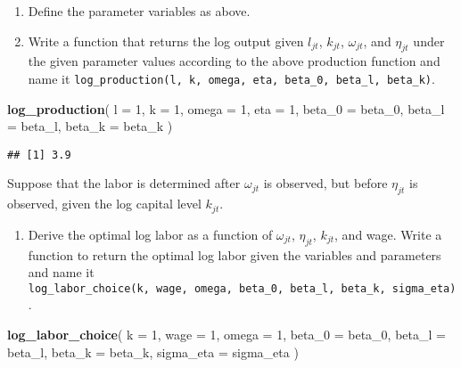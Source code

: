 \documentclass[
]{book}
\newenvironment{Shaded}{\begin{snugshade}}{\end{snugshade}}
\newcommand{\AttributeTok}[1]{\textcolor[rgb]{0.13,0.29,0.53}{#1}}
\newcommand{\DecValTok}[1]{\textcolor[rgb]{0.00,0.00,0.81}{#1}}
\newcommand{\FunctionTok}[1]{\textcolor[rgb]{0.13,0.29,0.53}{\textbf{#1}}}
\newcommand{\NormalTok}[1]{#1}
\providecommand{\tightlist}{%
  \setlength{\itemsep}{0pt}\setlength{\parskip}{0pt}}
\begin{document}
\begin{enumerate}
\def\labelenumi{\arabic{enumi}.}
\item
  Define the parameter variables as above.
\item
  Write a function that returns the log output given \(l_{jt}\), \(k_{jt}\), \(\omega_{jt}\), and \(\eta_{jt}\) under the given parameter values according to the above production function and name it \texttt{log\_production(l,\ k,\ omega,\ eta,\ beta\_0,\ beta\_l,\ beta\_k)}.
\end{enumerate}

\begin{Shaded}
\begin{Highlighting}[]
\FunctionTok{log\_production}\NormalTok{(}
    \AttributeTok{l =} \DecValTok{1}\NormalTok{,}
    \AttributeTok{k =} \DecValTok{1}\NormalTok{,}
    \AttributeTok{omega =} \DecValTok{1}\NormalTok{,}
    \AttributeTok{eta =} \DecValTok{1}\NormalTok{,}
    \AttributeTok{beta\_0 =}\NormalTok{ beta\_0,}
    \AttributeTok{beta\_l =}\NormalTok{ beta\_l,}
    \AttributeTok{beta\_k =}\NormalTok{ beta\_k}
\NormalTok{    ) }
\end{Highlighting}
\end{Shaded}

\begin{verbatim}
## [1] 3.9
\end{verbatim}

Suppose that the labor is determined after \(\omega_{jt}\) is observed, but before \(\eta_{jt}\) is observed, given the log capital level \(k_{jt}\).

\begin{enumerate}
\def\labelenumi{\arabic{enumi}.}
\setcounter{enumi}{2}
\tightlist
\item
  Derive the optimal log labor as a function of \(\omega_{jt}\), \(\eta_{jt}\), \(k_{jt}\), and wage. Write a function to return the optimal log labor given the variables and parameters and name it \texttt{log\_labor\_choice(k,\ wage,\ omega,\ beta\_0,\ beta\_l,\ beta\_k,\ sigma\_eta)}.
\end{enumerate}

\begin{Shaded}
\begin{Highlighting}[]
\FunctionTok{log\_labor\_choice}\NormalTok{(}
  \AttributeTok{k =} \DecValTok{1}\NormalTok{, }
  \AttributeTok{wage =} \DecValTok{1}\NormalTok{, }
  \AttributeTok{omega =} \DecValTok{1}\NormalTok{, }
  \AttributeTok{beta\_0 =}\NormalTok{ beta\_0, }
  \AttributeTok{beta\_l =}\NormalTok{ beta\_l, }
  \AttributeTok{beta\_k =}\NormalTok{ beta\_k, }
  \AttributeTok{sigma\_eta =}\NormalTok{ sigma\_eta}
\NormalTok{  )}
\end{Highlighting}
\end{Shaded}
\end{document}

